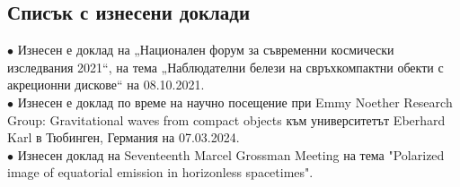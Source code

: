 \subsection{Списък с изнесени доклади}

$\bullet$ Изнесен е доклад на „Национален форум за
съвременни космически изследвания 2021“, на тема „Наблюдателни
белези на свръхкомпактни обекти с акреционни дискове“ на 08.10.2021.\\

\noindent$\bullet$ Изнесен е доклад по време на научно посещение при Emmy Noether Research Group: Gravitational waves from compact objects към  университетът Eberhard Karl в Тюбинген, Германия на 07.03.2024.\\

\noindent$\bullet$ Изнесен доклад на Seventeenth Marcel Grossman Meeting на тема "Polarized image of equatorial emission in horizonless spacetimes".
